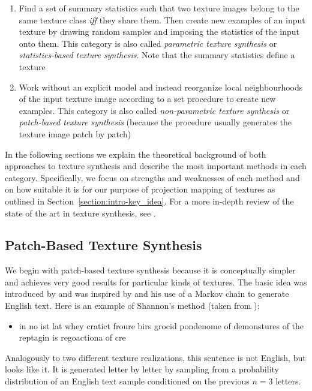 \begin{enumerate}
    \item Find a set of summary statistics such that two texture images belong to the same texture class \textit{iff} they share them. Then create new examples of an input texture by drawing random samples and imposing the statistics of the input onto them. This category is also called \textit{parametric texture synthesis} or \textit{statistics-based texture synthesis}. Note that the summary statistics define a texture
    \item Work without an explicit model and instead reorganize local neighbourhoods of the input texture image according to a set procedure to create new examples. This category is also called \textit{non-parametric texture synthesis} or \textit{patch-based texture synthesis} (because the procedure usually generates the texture image patch by patch)
\end{enumerate}

In the following sections we explain the theoretical background of both approaches to texture synthesis and describe the most important methods in each category. Specifically, we focus on strengths and weaknesses of each method and on how suitable it is for our purpose of projection mapping of textures as outlined in Section~\ref{section:intro-key_idea}. For a more in-depth review of the state of the art in texture synthesis, see \citet{Raad2018}.

\subsection{Patch-Based Texture Synthesis}
\label{section:background-texture_synthesis-patch_based}

We begin with patch-based texture synthesis because it is conceptually simpler and achieves very good results for particular kinds of textures. The basic idea was introduced by \citet{Efros1999} and was inspired by \citet{Shannon1948} and his use of a Markov chain to generate English text. Here is an example of Shannon's method (taken from \citet{Raad2018}):

\begin{itemize}
    \item in no ist lat whey cratict froure birs grocid pondenome of demonstures of the reptagin is regoactiona of cre
\end{itemize}

Analogously to two different texture realizations, this sentence is not English, but looks like it. It is generated letter by letter by sampling from a probability distribution of an English text sample conditioned on the previous \(n = 3\) letters.

